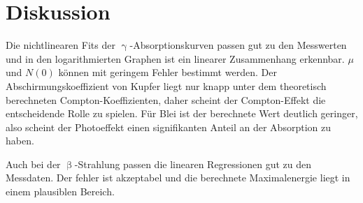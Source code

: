 \section{Diskussion}
\label{sec:Diskussion}

Die nichtlinearen Fits der $\upgamma$-Absorptionskurven passen gut zu den Messwerten und in den logarithmierten Graphen ist ein linearer Zusammenhang erkennbar. $\mu$ und $N(0)$ können mit geringem Fehler bestimmt werden. Der Abschirmungskoeffizient von Kupfer liegt nur knapp unter dem theoretisch berechneten Compton-Koeffizienten, daher scheint der Compton-Effekt die entscheidende Rolle zu spielen. Für Blei ist der berechnete Wert deutlich geringer, also scheint der Photoeffekt einen signifikanten Anteil an der Absorption zu haben.

Auch bei der $\upbeta$-Strahlung passen die linearen Regressionen gut zu den Messdaten. Der fehler ist akzeptabel und die berechnete Maximalenergie liegt in einem plausiblen Bereich.
